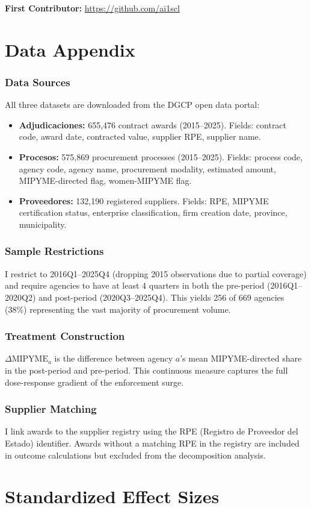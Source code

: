\documentclass[12pt]{article}
\begin{document}
\noindent\textbf{First Contributor:} \url{https://github.com/ai1scl}

\label{apep_main_text_end}
\newpage


\newpage
\appendix

\section{Data Appendix}

\subsubsection*{Data Sources} All three datasets are downloaded from the DGCP open data portal:
\begin{itemize}
\item \textbf{Adjudicaciones:} 655,476 contract awards (2015--2025). Fields: contract code, award date, contracted value, supplier RPE, supplier name.
\item \textbf{Procesos:} 575,869 procurement processes (2015--2025). Fields: process code, agency code, agency name, procurement modality, estimated amount, MIPYME-directed flag, women-MIPYME flag.
\item \textbf{Proveedores:} 132,190 registered suppliers. Fields: RPE, MIPYME certification status, enterprise classification, firm creation date, province, municipality.
\end{itemize}

\subsubsection*{Sample Restrictions} I restrict to 2016Q1--2025Q4 (dropping 2015 observations due to partial coverage) and require agencies to have at least 4 quarters in both the pre-period (2016Q1--2020Q2) and post-period (2020Q3--2025Q4). This yields 256 of 669 agencies (38\%) representing the vast majority of procurement volume.

\subsubsection*{Treatment Construction} $\Delta\text{MIPYME}_a$ is the difference between agency $a$'s mean MIPYME-directed share in the post-period and pre-period. This continuous measure captures the full dose-response gradient of the enforcement surge.

\subsubsection*{Supplier Matching} I link awards to the supplier registry using the RPE (Registro de Proveedor del Estado) identifier. Awards without a matching RPE in the registry are included in outcome calculations but excluded from the decomposition analysis.

\section{Standardized Effect Sizes}
\label{sec:sde}


\end{document}
